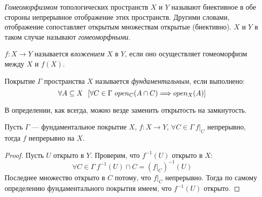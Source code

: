 \begin{definition}
	\textit{Гомеоморфизмом} топологических пространств $X$ и $Y$ называют
	биективное в обе стороны непрерывное отображение этих пространств. Другими
	словами, отображение сопоставляет открытым множествам открытые (биективно).
	$X$ и $Y$ в таком случае называют \textit{гомеоморфными}.
\end{definition}

\begin{definition}
	$f \colon X \to Y$ называется \textit{вложением} $X$ в $Y$, если оно
	осуществляет гомеоморфизм между $X$ и $f(X)$.
\end{definition}

\begin{definition}
	Покрытие $\Gamma$ пространства $X$ называется \textit{фундаментальным},
	если выполнено:
\[
	\forall A \subseteq X~~ [\forall C \in \Gamma~ open_C(A \cap C) \Longrightarrow open_X(A)]
\]
\end{definition}

\begin{remark}
	В определении, как всегда, можно везде заменить открытость на замкнутость.
\end{remark}

\begin{theorem}
	Пусть $\Gamma$ --- фундаментальное покрытие $X$, $f \colon X \to Y$, 
	$\forall C \in \Gamma~ f\big|_C$ непрерывно, тогда $f$ непрерывно на $X$.
\end{theorem}
\begin{proof}
	Пусть $U$ открыто в $Y$. Проверим, что $f^{-1}(U)$ открыто в $X$:
\[
	\forall C \in \Gamma~ f^{-1}(U) \cap C = \left(f\big|_C\right)^{-1}(U) 
\]
	Последнее множество открыто в $C$ потому, что $f\big|_C$ непрерывно.
	Тогда по самому определению фундаментального покрытия имеем, что
	$f^{-1}(U)$ открыто.
\end{proof}

